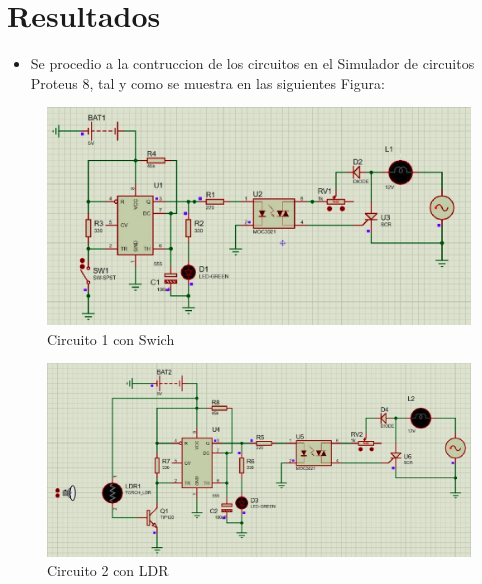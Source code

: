 \documentclass[osajnl,twocolumn,showpacs,superscriptaddress,10pt]{revtex4-1}
\begin{document}

\section{Resultados}

   
    
\begin{itemize}
	\item Se procedio a la contruccion de los circuitos en el Simulador de circuitos Proteus 8, tal y como se muestra en las siguientes Figura:
\end{itemize}

\begin{figure}[H]
\centering
\includegraphics[width = \columnwidth]{Fig_4.png}
\caption{Circuito 1 con Swich}
\end{figure}

\begin{figure}[H]
\centering
\includegraphics[width = \columnwidth]{Fig_5.png}
\caption{Circuito 2 con LDR}
\end{figure}
\end{document}
